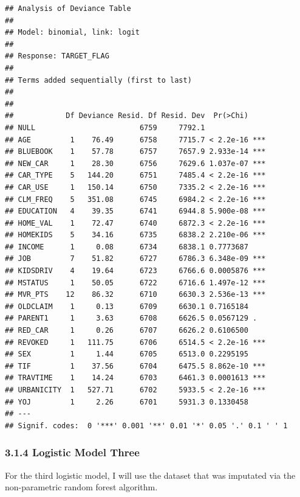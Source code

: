 \documentclass[]{article}
\begin{document}
\begin{verbatim}
## Analysis of Deviance Table
## 
## Model: binomial, link: logit
## 
## Response: TARGET_FLAG
## 
## Terms added sequentially (first to last)
## 
## 
##            Df Deviance Resid. Df Resid. Dev  Pr(>Chi)    
## NULL                        6759     7792.1              
## AGE         1    76.49      6758     7715.7 < 2.2e-16 ***
## BLUEBOOK    1    57.78      6757     7657.9 2.933e-14 ***
## NEW_CAR     1    28.30      6756     7629.6 1.037e-07 ***
## CAR_TYPE    5   144.20      6751     7485.4 < 2.2e-16 ***
## CAR_USE     1   150.14      6750     7335.2 < 2.2e-16 ***
## CLM_FREQ    5   351.08      6745     6984.2 < 2.2e-16 ***
## EDUCATION   4    39.35      6741     6944.8 5.900e-08 ***
## HOME_VAL    1    72.47      6740     6872.3 < 2.2e-16 ***
## HOMEKIDS    5    34.16      6735     6838.2 2.210e-06 ***
## INCOME      1     0.08      6734     6838.1 0.7773687    
## JOB         7    51.82      6727     6786.3 6.348e-09 ***
## KIDSDRIV    4    19.64      6723     6766.6 0.0005876 ***
## MSTATUS     1    50.05      6722     6716.6 1.497e-12 ***
## MVR_PTS    12    86.32      6710     6630.3 2.536e-13 ***
## OLDCLAIM    1     0.13      6709     6630.1 0.7165184    
## PARENT1     1     3.63      6708     6626.5 0.0567129 .  
## RED_CAR     1     0.26      6707     6626.2 0.6106500    
## REVOKED     1   111.75      6706     6514.5 < 2.2e-16 ***
## SEX         1     1.44      6705     6513.0 0.2295195    
## TIF         1    37.56      6704     6475.5 8.862e-10 ***
## TRAVTIME    1    14.24      6703     6461.3 0.0001613 ***
## URBANICITY  1   527.71      6702     5933.5 < 2.2e-16 ***
## YOJ         1     2.26      6701     5931.3 0.1330458    
## ---
## Signif. codes:  0 '***' 0.001 '**' 0.01 '*' 0.05 '.' 0.1 ' ' 1
\end{verbatim}

\subsubsection{3.1.4 Logistic Model Three}\label{logistic-model-three}

For the third logistic model, I will use the dataset that was imputated
via the non-parametric random forest algorithm.
\end{document}
